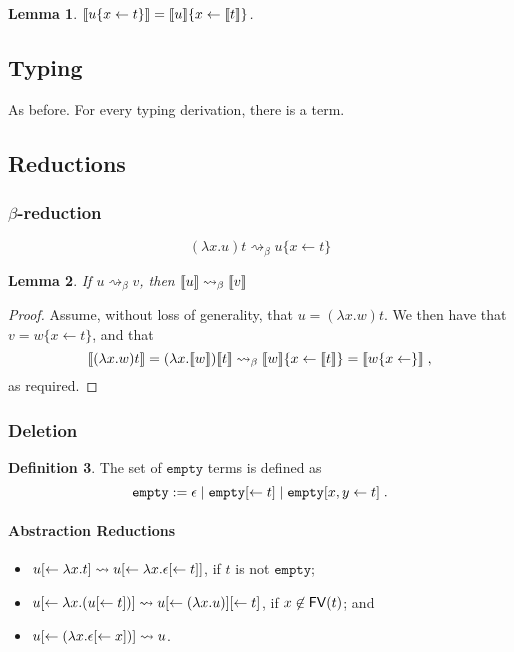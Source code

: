 \documentclass[11pt,a4paper]{article}
\theoremstyle{definition}
\newtheorem{definition}{Definition}
\theoremstyle{plain}
\newtheorem{lemma}[definition]{Lemma}
\theoremstyle{remark}
\begin{document}
\begin{lemma}
	${\llbracket{u\{x\leftarrow t\}}\rrbracket}={\llbracket{u}\rrbracket}\{x\leftarrow{\llbracket{t}\rrbracket}\}$.
\end{lemma}

\subsection{Typing}

As before. For every typing derivation, there is a term.

\subsection{Reductions}

\subsubsection{$\beta$-reduction}

\[
(\lambda x.u)t \rightsquigarrow_\beta u\{x\leftarrow t\}
\]


\begin{lemma}
	If $u\rightsquigarrow_\beta v$, then ${\llbracket{u}\rrbracket}\rightsquigarrow_\beta{\llbracket{v}\rrbracket}$
\end{lemma}

\begin{proof}
	Assume, without loss of generality, that $u=(\lambda x.w)t$. We then have that $v=w\{x\leftarrow t\}$, and that
	\[
	{\llbracket{(\lambda x.w)t}\rrbracket}=(\lambda x.{\llbracket{w}\rrbracket}){\llbracket{t}\rrbracket}\rightsquigarrow_\beta{\llbracket{w}\rrbracket}\{x\leftarrow{\llbracket{t}\rrbracket}\}={\llbracket{w\{x\leftarrow\}}\rrbracket}\;,
	\]
	as required.
\end{proof}

\subsubsection{Deletion}

\newcommand{\tempty}{{\mathtt{empty}}}

\begin{definition}
	The set of $\tempty$ terms is defined as
	\[\tempty:=\epsilon\;|\;\tempty\terdel{t}\;|\;\tempty\terdup{x}{y}{t}\;.\]
\end{definition}

\paragraph{Abstraction Reductions}

\begin{itemize}
	\item $u{[\leftarrow{\lambda x.t}]}\rightsquigarrow u{[\leftarrow{\lambda x.\epsilon{[\leftarrow{t}]}}]}$, if $t$ is not $\tempty$;
	\item $u{[\leftarrow{\lambda x.(u{[\leftarrow{t}]})}]}\rightsquigarrow u{[\leftarrow{(\lambda x.u)}]}{[\leftarrow{t}]}$, if $x\not\in{\mathop{\mathsf{FV}}}(t)$; and
	\item $u{[\leftarrow{(\lambda x.\epsilon{[\leftarrow{x}]})}]}\rightsquigarrow u$.
\end{itemize}
\end{document}
